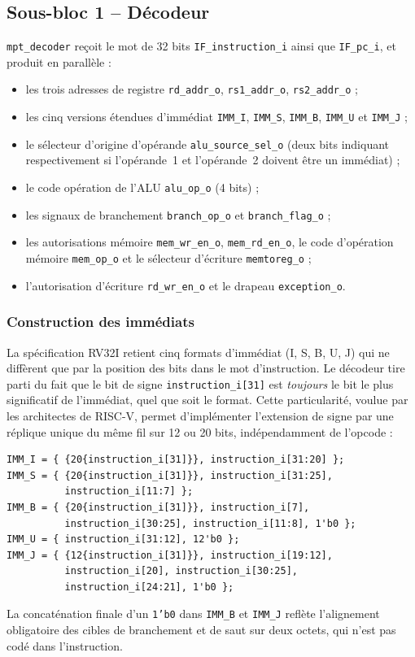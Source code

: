\documentclass[11pt,a4paper,oneside]{report}
\begin{document}
\subsection{Sous-bloc 1 -- Décodeur}
\texttt{mpt\_decoder} reçoit le mot de 32 bits
\texttt{IF\_instruction\_i} ainsi que \texttt{IF\_pc\_i}, et
produit en parallèle :
\begin{itemize}
  \item les trois adresses de registre \texttt{rd\_addr\_o},
        \texttt{rs1\_addr\_o}, \texttt{rs2\_addr\_o} ;
  \item les cinq versions étendues d'immédiat
        \texttt{IMM\_I}, \texttt{IMM\_S}, \texttt{IMM\_B},
        \texttt{IMM\_U} et \texttt{IMM\_J} ;
  \item le sélecteur d'origine d'opérande
        \texttt{alu\_source\_sel\_o} (deux bits indiquant
        respectivement si l'opérande~1 et l'opérande~2 doivent
        être un immédiat) ;
  \item le code opération de l'ALU \texttt{alu\_op\_o} (4 bits) ;
  \item les signaux de branchement \texttt{branch\_op\_o} et
        \texttt{branch\_flag\_o} ;
  \item les autorisations mémoire \texttt{mem\_wr\_en\_o},
        \texttt{mem\_rd\_en\_o}, le code d'opération mémoire
        \texttt{mem\_op\_o} et le sélecteur d'écriture
        \texttt{memtoreg\_o} ;
  \item l'autorisation d'écriture \texttt{rd\_wr\_en\_o} et le
        drapeau \texttt{exception\_o}.
\end{itemize}

\subsubsection*{Construction des immédiats}
La spécification RV32I retient cinq formats d'immédiat (I, S, B, U,
J) qui ne diffèrent que par la position des bits dans le mot
d'instruction. Le décodeur tire parti du fait que le bit de signe
\texttt{instruction\_i[31]} est \emph{toujours} le bit le plus
significatif de l'immédiat, quel que soit le format. Cette
particularité, voulue par les architectes de RISC-V, permet
d'implémenter l'extension de signe par une réplique unique du même
fil sur 12 ou 20 bits, indépendamment de l'opcode :
\begin{lstlisting}[caption={Construction des cinq immédiats dans
\texttt{mpt\_decoder}.},label={lst:imm}]
IMM_I = { {20{instruction_i[31]}}, instruction_i[31:20] };
IMM_S = { {20{instruction_i[31]}}, instruction_i[31:25],
          instruction_i[11:7] };
IMM_B = { {20{instruction_i[31]}}, instruction_i[7],
          instruction_i[30:25], instruction_i[11:8], 1'b0 };
IMM_U = { instruction_i[31:12], 12'b0 };
IMM_J = { {12{instruction_i[31]}}, instruction_i[19:12],
          instruction_i[20], instruction_i[30:25],
          instruction_i[24:21], 1'b0 };
\end{lstlisting}
La concaténation finale d'un \texttt{1'b0} dans \texttt{IMM\_B} et
\texttt{IMM\_J} reflète l'alignement obligatoire des cibles de
branchement et de saut sur deux octets, qui n'est pas codé dans
l'instruction.
\end{document}
